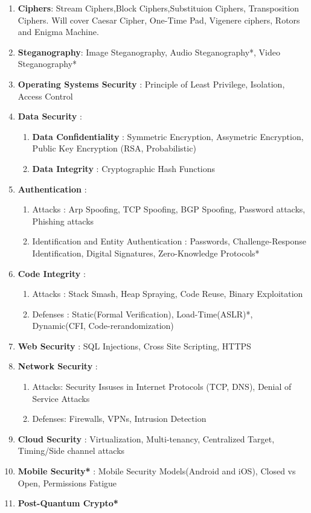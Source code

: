 \documentclass[11pt]{article}
\begin{document}
\begin{enumerate}
	\item \textbf{Ciphers}: Stream Ciphers,Block Ciphers,Substituion Ciphers, Transposition Ciphers. Will cover Caesar Cipher, One-Time Pad, Vigenere ciphers, Rotors and Enigma Machine.
	\item \textbf{Steganography}: Image Steganography, Audio Steganography*, Video Steganography*
   \item \textbf{Operating Systems Security} : Principle of Least Privilege, Isolation, Access Control
	\item \textbf{Data Security} : \begin{enumerate}
			\item \textbf{Data Confidentiality} : Symmetric Encryption, Assymetric Encryption, Public Key Encryption (RSA, Probabilistic) 
			\item \textbf{Data Integrity} : Cryptographic Hash Functions
	   \end{enumerate}
   \item \textbf{Authentication} : \begin{enumerate}
		   \item Attacks : Arp Spoofing, TCP Spoofing, BGP Spoofing, Password attacks, Phishing attacks
		   \item Identification and Entity Authentication : Passwords, Challenge-Response Identification, Digital Signatures, Zero-Knowledge Protocols*
	   \end{enumerate}
   \item \textbf{Code Integrity} : \begin{enumerate} 
		   \item Attacks : Stack Smash, Heap Spraying, Code Reuse, Binary Exploitation
		   \item Defenses : Static(Formal Verification), Load-Time(ASLR)*, Dynamic(CFI, Code-rerandomization)
	   \end{enumerate}
   \item \textbf{Web Security} : SQL Injections, Cross Site Scripting, HTTPS
   \item \textbf{Network Security} :  \begin{enumerate}
		   \item Attacks: Security Issuses in Internet Protocols (TCP, DNS), Denial of Service Attacks
		   \item Defenses: Firewalls, VPNs, Intrusion Detection
	   \end{enumerate}
   \item \textbf{Cloud Security} : Virtualization, Multi-tenancy, Centralized Target, Timing/Side channel attacks
   \item \textbf{Mobile Security*} : Mobile Security Models(Android and iOS), Closed vs Open, Permissions Fatigue
   \item \textbf{Post-Quantum Crypto*}
\end{enumerate}
\end{document}
